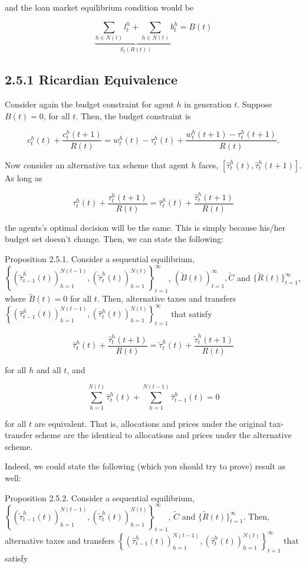 \documentclass[10pt]{article}
\begin{document}
and the loan market equilibrium condition would be

$$
\underbrace{\sum_{h \in N(t)} l_{t}^{h}+\sum_{h \in N(t)} b_{t}^{h}}_{S_{t}(R(t))}=B(t)
$$

\subsection*{2.5.1 Ricardian Equivalence}
Consider again the budget constraint for agent $h$ in generation $t$. Suppose $B(t)=0$, for all $t$. Then, the budget constraint is

$$
c_{t}^{h}(t)+\frac{c_{t}^{h}(t+1)}{R(t)}=w_{t}^{h}(t)-\tau_{t}^{h}(t)+\frac{w_{t}^{h}(t+1)-\tau_{t}^{h}(t+1)}{R(t)} .
$$

Now consider an alternative tax scheme that agent $h$ faces, $\left[\widehat{\tau}_{t}^{h}(t), \widehat{\tau}_{t}^{h}(t+1)\right]$. As long as

$$
\tau_{t}^{h}(t)+\frac{\tau_{t}^{h}(t+1)}{R(t)}=\widehat{\tau}_{t}^{h}(t)+\frac{\widehat{\tau}_{t}^{h}(t+1)}{R(t)}
$$

the agents's optimal decision will be the same. This is simply because his/her budget set doesn't change. Then, we can state the following:

Proposition 2.5.1. Consider a sequential equilibrium, $\left\{\left(\widetilde{\tau}_{t-1}^{h}(t)\right)_{h=1}^{N(t-1)},\left(\widetilde{\tau}_{t}^{h}(t)\right)_{h=1}^{N(t)}\right\}_{t=1}^{\infty}$, $(\widetilde{B}(t))_{t=1}^{\infty}, \widetilde{C}$ and $\{\widetilde{R}(t)\}_{t=1}^{\infty}$, where $\widetilde{B}(t)=0$ for all $t$. Then, alternative taxes and transfers $\left\{\left(\widehat{\tau}_{t-1}^{h}(t)\right)_{h=1}^{N(t-1)},\left(\widehat{\tau}_{t}^{h}(t)\right)_{h=1}^{N(t)}\right\}_{t=1}^{\infty}$ that satisfy

$$
\widehat{\tau}_{t}^{h}(t)+\frac{\widehat{\tau}_{t}^{h}(t+1)}{R(t)}=\widetilde{\tau}_{t}^{h}(t)+\frac{\widetilde{\tau}_{t}^{h}(t+1)}{R(t)}
$$

for all $h$ and all $t$, and

$$
\sum_{h=1}^{N(t)} \widehat{\tau}_{t}^{h}(t)+\sum_{h=1}^{N(t-1)} \widehat{\tau}_{t-1}^{h}(t)=0
$$

for all $t$ are equivalent. That is, allocations and prices under the original tax-transfer scheme are the identical to allocations and prices under the alternative scheme.

Indeed, we could state the following (which you should try to prove) result as well:

Proposition 2.5.2. Consider a sequential equilibrium, $\left\{\left(\widetilde{\tau}_{t-1}^{h}(t)\right)_{h=1}^{N(t-1)},\left(\widetilde{\tau}_{t}^{h}(t)\right)_{h=1}^{N(t)}\right\}_{t=1}^{\infty}$, $\widetilde{C}$ and $\{\widetilde{R}(t)\}_{t=1}^{\infty}$. Then, alternative taxes and transfers $\left\{\left(\widehat{\tau}_{t-1}^{h}(t)\right)_{h=1}^{N(t-1)},\left(\widehat{\tau}_{t}^{h}(t)\right)_{h=1}^{N(t)}\right\}_{t=1}^{\infty}$ that satisfy
\end{document}
